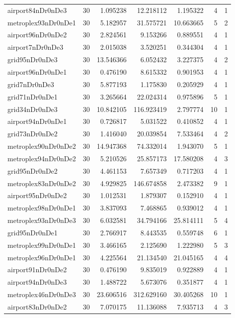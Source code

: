\begin{longtable}{|l|r|r|r|r|r|r|}
airport84nDr0nDe3 & 30 & 1.095238 & 12.218112 & 1.195322 & 4 & 1 \\
metroplex93nDr0nDe1 & 30 & 5.182957 & 31.575721 & 10.663665 & 5 & 2 \\
airport96nDr0nDe2 & 30 & 2.824561 & 9.153266 & 0.889551 & 4 & 1 \\
airport7nDr0nDe3 & 30 & 2.015038 & 3.520251 & 0.344304 & 4 & 1 \\
grid95nDr0nDe3 & 30 & 13.546366 & 6.052432 & 3.227375 & 4 & 2 \\
airport96nDr0nDe1 & 30 & 0.476190 & 8.615332 & 0.901953 & 4 & 1 \\
grid7nDr0nDe3 & 30 & 5.877193 & 1.175830 & 0.205929 & 4 & 1 \\
grid71nDr0nDe1 & 30 & 3.265664 & 22.024314 & 0.975896 & 5 & 1 \\
grid34nDr0nDe3 & 30 & 10.842105 & 116.923419 & 2.797774 & 10 & 1 \\
airport94nDr0nDe1 & 30 & 0.726817 & 5.031522 & 0.410852 & 4 & 1 \\
grid73nDr0nDe2 & 30 & 1.416040 & 20.039854 & 7.533464 & 4 & 2 \\
metroplex90nDr0nDe2 & 30 & 14.947368 & 74.332014 & 1.943070 & 5 & 1 \\
metroplex94nDr0nDe2 & 30 & 5.210526 & 25.857173 & 17.580208 & 4 & 3 \\
grid95nDr0nDe2 & 30 & 4.461153 & 7.657349 & 0.717203 & 4 & 1 \\
metroplex83nDr0nDe2 & 30 & 4.929825 & 146.674858 & 2.473382 & 9 & 1 \\
airport95nDr0nDe2 & 30 & 1.012531 & 1.879307 & 0.152910 & 4 & 1 \\
metroplex98nDr0nDe1 & 30 & 3.837093 & 7.468865 & 0.939012 & 4 & 1 \\
metroplex93nDr0nDe3 & 30 & 6.032581 & 34.794166 & 25.814111 & 5 & 4 \\
grid95nDr0nDe1 & 30 & 2.766917 & 8.443535 & 0.559748 & 6 & 1 \\
metroplex99nDr0nDe1 & 30 & 3.466165 & 2.125690 & 1.222980 & 5 & 3 \\
metroplex96nDr0nDe1 & 30 & 4.225564 & 21.134540 & 21.045165 & 4 & 4 \\
airport91nDr0nDe2 & 30 & 0.476190 & 9.835019 & 0.922889 & 4 & 1 \\
airport94nDr0nDe3 & 30 & 1.488722 & 5.673076 & 0.351877 & 4 & 1 \\
metroplex46nDr0nDe3 & 30 & 23.606516 & 312.629160 & 30.405268 & 10 & 1 \\
airport83nDr0nDe2 & 30 & 7.070175 & 11.136088 & 7.935713 & 4 & 3 \\

\end{longtable}
